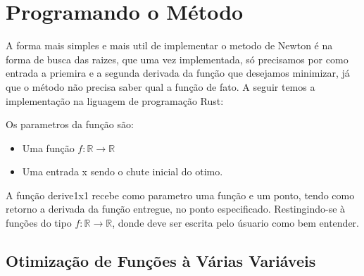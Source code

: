 \section{{Programando o Método}}

\hspace{0.8cm}

A forma mais simples e mais util de implementar o metodo de Newton é na forma
de busca das raizes, que uma vez  implementada, só precisamos por como entrada
a priemira e a segunda derivada da função que desejamos minimizar, já que o
método não precisa saber qual a função de fato. A seguir temos a implementação
na liguagem de programação Rust:



Os parametros da função são:

    \begin{itemize}
            \item Uma função \(f : \mathbb{R} \rightarrow \mathbb{R}\)
            \item Uma entrada x sendo o chute inicial do otimo.
    \end{itemize}


A função derive1x1 recebe como parametro uma função e um ponto, tendo como
retorno a derivada da função entregue, no ponto especificado. Restingindo-se
à funções do tipo \(f : \mathbb{R} \rightarrow \mathbb{R}\), donde deve ser
escrita pelo úsuario como bem entender.



\textcolor[rgb]{1,0,0}{\section{{Otimização de Funções à Várias Variáveis}}}

\hspace{0.8cm}





%

